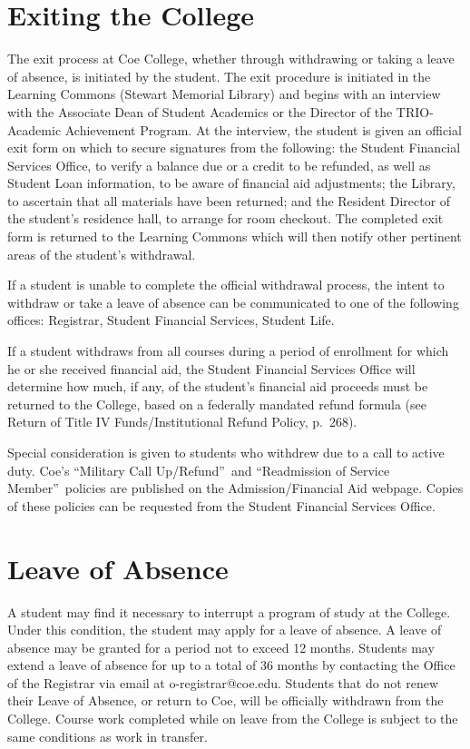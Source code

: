 \documentclass[
  letterpaper,
]{scrbook}
\begin{document}
\hypertarget{exiting-the-college}{%
\section{Exiting the College}\label{exiting-the-college}}

The exit process at Coe College, whether through withdrawing or taking a
leave of absence, is initiated by the student. The exit procedure is
initiated in the Learning Commons (Stewart Memorial Library) and begins
with an interview with the Associate Dean of Student Academics or the
Director of the TRIO-Academic Achievement Program. At the interview, the
student is given an official exit form on which to secure signatures
from the following: the Student Financial Services Office, to verify a
balance due or a credit to be refunded, as well as Student Loan
information, to be aware of financial aid adjustments; the Library, to
ascertain that all materials have been returned; and the Resident
Director of the student's residence hall, to arrange for room checkout.
The completed exit form is returned to the Learning Commons which will
then notify other pertinent areas of the student's withdrawal.

If a student is unable to complete the official withdrawal process, the
intent to withdraw or take a leave of absence can be communicated to one
of the following offices: Registrar, Student Financial Services, Student
Life.

If a student withdraws from all courses during a period of enrollment
for which he or she received financial aid, the Student Financial
Services Office will determine how much, if any, of the student's
financial aid proceeds must be returned to the College, based on a
federally mandated refund formula (see Return of Title IV
Funds/Institutional Refund Policy, p.~268).

Special consideration is given to students who withdrew due to a call to
active duty. Coe's ``Military Call Up/Refund''~and ``Readmission of
Service Member''~policies are published on the Admission/Financial Aid
webpage. Copies of these policies can be requested from the Student
Financial Services Office.

\hypertarget{leave-of-absence}{%
\section{Leave of Absence}\label{leave-of-absence}}

A student may find it necessary to interrupt a program of study at the
College. Under this condition, the student may apply for a leave of
absence. A leave of absence may be granted for a period not to exceed 12
months. Students may extend a leave of absence for up to a total of 36
months by contacting the Office of the Registrar via email at
o-registrar@coe.edu. Students that do not renew their Leave of Absence,
or return to Coe, will be officially withdrawn from the College. Course
work completed while on leave from the College is subject to the same
conditions as work in transfer.
\end{document}
